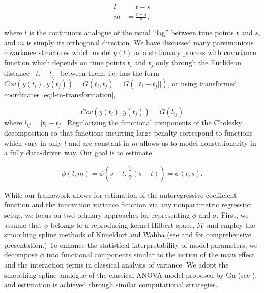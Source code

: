 \documentclass[12pt]{article}
\theoremstyle{definition}
\begin{document}
\begin{align} 
\begin{split}\label{eq:l-m-transformation}
l &= t - s \\
m &= \frac{t + s}{2}, \\
\end{split}
\end{align}
\noindent
 where $l$ is the continuous analogue of the usual ``lag'' between time points $t$ and $s$, and $m$ is simply its orthogonal direction. We have discussed many parsimonious covariance structures which model $y\left(t\right)$ as a stationary process with covariance function which depends on time points $t_i$ and $t_j$ only through the Euclidean distance $\vert \vert t_i - t_j \vert \vert$ between them, i.e. has the form $Cov\left(y\left( t_i \right),y\left( t_j \right)\right) =G\left(t_i,t_j\right) = G\left(\vert \vert t_i - t_j \vert \vert \right)$, or using transformed coordinates \ref{eq:l-m-transformation},

\begin{equation*}
Cov\left(y\left( t_i \right),y\left( t_j \right)\right) = G\left( l_{ij}  \right)
\end{equation*}
\noindent
where $l_{ij} =  \vert  t_i - t_j  \vert $. Regularizing the functional components of the Cholesky decomposition so that functions incurring large penalty correspond to functions which vary in only $l$ and are constant in $m$ allows us to model nonstationarity in a fully data-driven way.  Our goal is to estimate

\begin{equation}
\phi\left(l,m\right) = \phi\left(s-t, \frac{1}{2}\left(s+t\right)\right) = \tilde{\phi}\left(t,s\right).
\end{equation}

\bigskip

While our framework allows for estimation of the autoregressive coefficient function and the innovation variance function via any nonparametric regression setup, we focus on two primary approaches for representing $\phi$ and $\sigma$. First, we assume that $\phi$ belongs to a reproducing kernel Hilbert space, $\mathcal{H}$ and employ the smoothing spline methods of Kimeldorf and Wahba (see \citet{kimeldorf1971some} and \citet{wahba1990spline} for comprehensive presentation.)  To enhance the statistical interpretability of model parameters, we decompose $\phi$ into functional components similar to the notion of the main effect and the interaction terms in classical analysis of variance. We adopt the smoothing spline analogue of the classical ANOVA model proposed by Gu (see \citet{gu2013smoothing}), and estimation is achieved through similar computational strategies.
\end{document}
